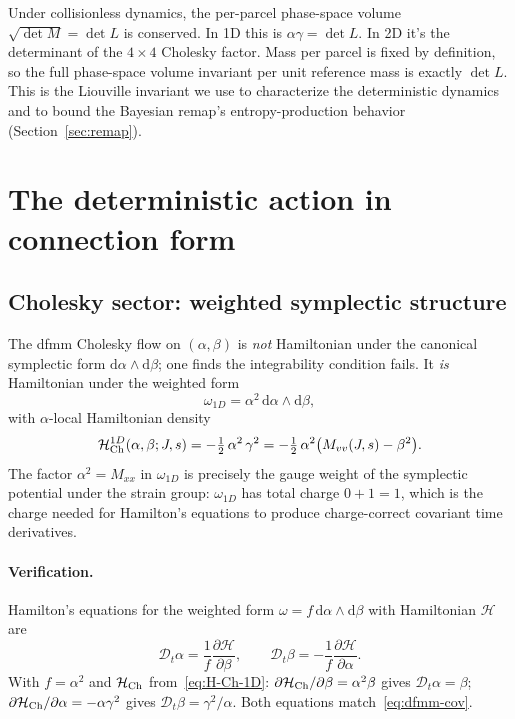 \documentclass[11pt]{article}
\newcommand{\dd}{\mathrm{d}}
\newcommand{\half}{\tfrac{1}{2}}
\begin{document}
Under collisionless dynamics, the per-parcel phase-space volume
$\sqrt{\det M} = \det L$ is conserved. In 1D this is
$\alpha\gamma = \det L$. In 2D it's the determinant of the $4\times 4$
Cholesky factor. Mass per parcel is fixed by definition, so the full
phase-space volume invariant per unit reference mass is exactly
$\det L$. This is the Liouville invariant we use to characterize the
deterministic dynamics and to bound the Bayesian remap's
entropy-production behavior (Section~\ref{sec:remap}).

\section{The deterministic action in connection form}
\label{sec:action}

\subsection{Cholesky sector: weighted symplectic structure}

The dfmm Cholesky flow on $(\alpha,\beta)$ is \emph{not} Hamiltonian
under the canonical symplectic form $\dd\alpha\wedge\dd\beta$; one
finds the integrability condition fails. It \emph{is} Hamiltonian
under the weighted form
\begin{equation}
  \omega_{1D} = \alpha^2\,\dd\alpha\wedge\dd\beta,
  \label{eq:omega-1D}
\end{equation}
with $\alpha$-local Hamiltonian density
\begin{equation}
  \mathcal{H}^{1D}_{\rm Ch}(\alpha,\beta;J,s)
  = -\half\,\alpha^2\,\gamma^2
  = -\half\,\alpha^2\bigl(M_{vv}(J,s) - \beta^2\bigr).
  \label{eq:H-Ch-1D}
\end{equation}
The factor $\alpha^2 = M_{xx}$ in $\omega_{1D}$ is precisely the gauge
weight of the symplectic potential under the strain group: $\omega_{1D}$
has total charge $0+1=1$, which is the charge needed for Hamilton's
equations to produce charge-correct covariant time derivatives.

\paragraph{Verification.} Hamilton's equations for the weighted form
$\omega = f\,\dd\alpha\wedge\dd\beta$ with Hamiltonian $\mathcal{H}$
are
\begin{equation}
  \mathcal{D}_t\alpha = \frac{1}{f}\frac{\partial\mathcal{H}}{\partial\beta},\qquad
  \mathcal{D}_t\beta = -\frac{1}{f}\frac{\partial\mathcal{H}}{\partial\alpha}.
\end{equation}
With $f = \alpha^2$ and $\mathcal{H}_{\rm Ch}$ from~\eqref{eq:H-Ch-1D}:
$\partial\mathcal{H}_{\rm Ch}/\partial\beta = \alpha^2\beta$ gives
$\mathcal{D}_t\alpha = \beta$;
$\partial\mathcal{H}_{\rm Ch}/\partial\alpha = -\alpha\gamma^2$ gives
$\mathcal{D}_t\beta = \gamma^2/\alpha$.
Both equations match~\eqref{eq:dfmm-cov}. \checkmark
\end{document}
